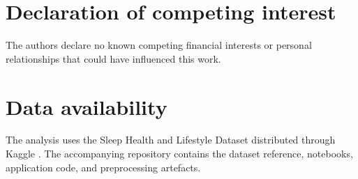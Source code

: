 ﻿\documentclass[preprint,12pt]{elsarticle}
\begin{document}
\section*{Declaration of competing interest}
The authors declare no known competing financial interests or personal relationships that could have influenced this work.

\section*{Data availability}
The analysis uses the Sleep Health and Lifestyle Dataset distributed through Kaggle \cite{kaggle_sleep}. The accompanying repository contains the dataset reference, notebooks, application code, and preprocessing artefacts.



\end{document}
